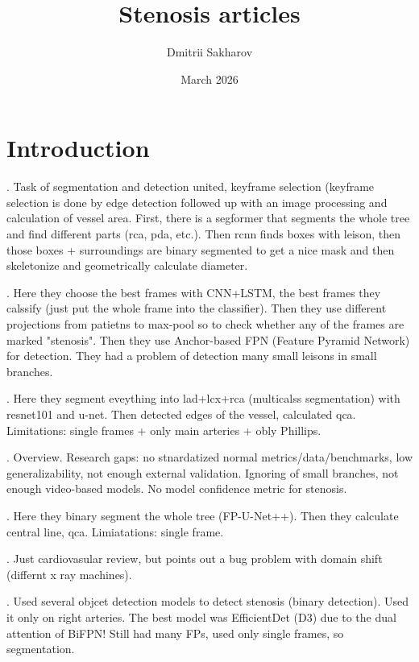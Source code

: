 \documentclass{article}
\title{Stenosis articles}
\author{Dmitrii Sakharov}
\date{March 2026}
\begin{document}
\maketitle

\section{Introduction}
\cite{aipoweredrealtime}. Task of segmentation and detection united, keyframe selection (keyframe selection is done by edge detection followed up with an image processing and calculation of vessel area. First, there is a segformer that segments the whole tree and find different parts (rca, pda, etc.). Then rcnn finds boxes with leison, then those boxes + surroundings are binary segmented to get a nice mask and then skeletonize and geometrically calculate diameter. 

\cite{fvcm}. Here they choose the best frames with CNN+LSTM, the best frames they calssify (just put the whole frame into the classifier). Then they use different projections from patietns to max-pool so to check whether any of the frames are marked "stenosis". Then they use Anchor-based FPN (Feature Pyramid Network) for detection. They had a problem of detection many small leisons in small branches. 

\cite{molenar}. Here they segment eveything into lad+lcx+rca (multicalss segmentation) with resnet101 and u-net. Then detected edges of the vessel, calculated qca. Limitations: single frames + only main arteries + obly Phillips. 


\cite{popov2022reviewmodernapproachescoronary}. Overview. Research gaps: no stnardatized normal metrics/data/benchmarks, low generalizability, not enough external validation. Ignoring of small branches, not enough video-based models. No model confidence metric for stenosis.  

\cite{ZHAO2021104667}. Here they binary segment the whole tree (FP-U-Net++). Then they calculate central line, qca. Limiatations: single frame. 

\cite{cardiovascular}. Just cardiovasular review, but points out a bug problem with domain shift (differnt x ray machines).

\cite{attentionstenosis}. Used several objcet detection models to detect stenosis (binary detection). Used it only on right arteries. The best model was EfficientDet (D3) due to the dual attention of BiFPN! Still had many FPs, used only single frames, so segmentation.
\end{document}
